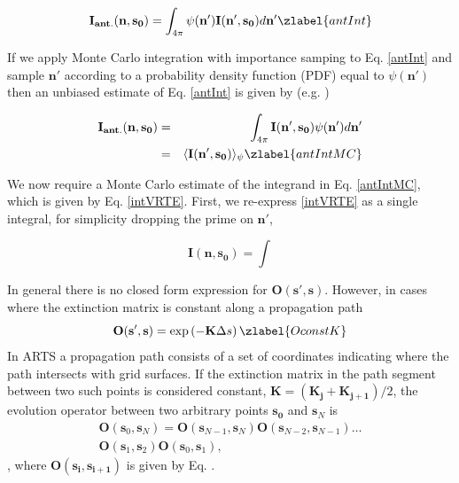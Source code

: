 \begin{equation}
\mathbf{I_{ant.}(n,s_0)}=\int_{4\pi}\psi(\mathbf{n'})\mathbf{I(n',s_0)}d\mathbf{n'}
\zlabel{antInt}
\end{equation}

If we apply Monte Carlo integration with importance samping to
Eq. \ref{antInt} and sample $\mathbf{n'}$ according to a probability
density function (PDF) equal to $\psi(\mathbf{n'})$ then an unbiased
estimate of Eq. \ref{antInt} is given by (e.g. \cite{press:1992:numerical})

\begin{eqnarray}
\mathbf{I_{ant.}(n,s_0)}&=&\int_{4\pi}\mathbf{I(n',s_0)}\psi(\mathbf{n'})d\mathbf{n'}\\
&=&\langle \mathbf{I(n',s_0)} \rangle_\psi
\zlabel{antIntMC}
\end{eqnarray}

We now require a Monte Carlo estimate of the integrand in
Eq. \ref{antIntMC}, which is given by Eq. \ref{intVRTE}.  First, we
re-express \ref{intVRTE} as a single integral, for simplicity dropping
the prime on $\mathbf{n'}$,

\begin{equation}
\mathbf{I(n,s_0)}=\int
\end{equation}



In general there is no closed form expression for $\mathbf{O(s',s)}$.
However, in cases where the extinction matrix is constant along a
propagation path
\begin{equation}
\mathbf{O(s',s)}=\exp\left(-\mathbf{K}\Delta s\right)
\zlabel{OconstK}
\end{equation}
In ARTS a propagation path consists of a set of coordinates
indicating where the path intersects with grid surfaces.  If the
extinction matrix in the path segment between two such points is
considered constant, $\mathbf{K}=(\mathbf{K_j}+\mathbf{K_{j+1}})/2$,
the evolution operator between two arbitrary points $\mathbf{s_0}$ and
$\mathbf{s}_N$ is
\begin{eqnarray}
\mathbf{O}(\mathbf{s}_0,\mathbf{s}_N) =
\mathbf{O}(\mathbf{s}_{N-1},\mathbf{s}_N)
\mathbf{O}(\mathbf{s}_{N-2},\mathbf{s}_{N-1}) \dots \nonumber\\
\mathbf{O}(\mathbf{s}_1,\mathbf{s}_2)\mathbf{O}(\mathbf{s}_0,\mathbf{s}_1),
\end{eqnarray}
, where $\mathbf{O(s_i,s_{i+1})}$ is given by Eq. .

